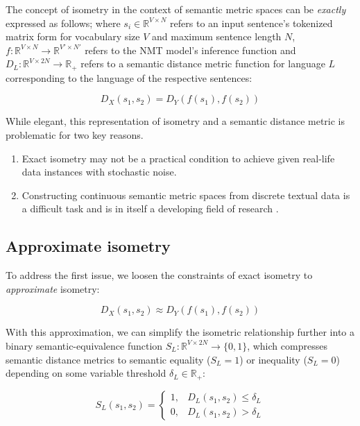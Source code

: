 \documentclass[11pt,a4paper]{article}
\begin{document}
The concept of isometry in the context of semantic metric spaces can be \textit{exactly} expressed as follows; where $s_i \in \mathbb{R}^{V \times N}$ refers to an input sentence's tokenized matrix form for vocabulary size $V$ and maximum sentence length $N$, $f: \mathbb{R}^{V \times N} \to \mathbb{R}^{V' \times N'}$ refers to the NMT model's inference function and $D_L: \mathbb{R}^{V \times 2N} \to \mathbb{R}_+$ refers to a semantic distance metric function for language $L$ corresponding to the language of the respective sentences:

\begin{equation}  
  \label{exact_isometry_eqn}
  D_X(s_1,s_2) = D_Y(f(s_1),f(s_2))
\end{equation}

While elegant, this representation of isometry and a semantic distance metric is problematic for two key reasons.

\begin{enumerate}
\item Exact isometry may not be a practical condition to achieve given real-life data instances with stochastic noise.
\item Constructing continuous semantic metric spaces from discrete textual data is a difficult task and is in itself a developing field of research \cite{cer2017semeval, michel2019evaluation}.
\end{enumerate}

\subsection{Approximate isometry}

To address the first issue, we loosen the constraints of exact isometry to \textit{approximate} isometry:

\begin{equation} 
  \label{approx_isometry_eqn}
  D_X(s_1,s_2) \approx D_Y(f(s_1),f(s_2)) 
\end{equation}

With this approximation, we can simplify the isometric relationship further into a binary semantic-equivalence function $S_L: \mathbb{R}^{V \times 2N} \to \{0,1\}$, which compresses semantic distance metrics to semantic equality ($S_L=1$) or inequality ($S_L=0$) depending on some variable threshold $\delta_L \in \mathbb{R}_+$:

\begin{equation}
  \label{bounded_isometry_eqn}
  S_L(s_1,s_2) =
  \begin{cases}
    1, &D_L(s_1,s_2) \leq \delta_L \\
    0, &D_L(s_1,s_2) > \delta_L
  \end{cases}
\end{equation}
\end{document}
